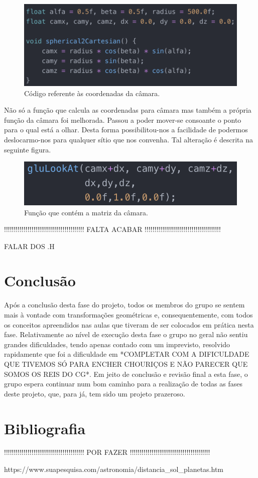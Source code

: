 \documentclass[a4paper]{article}
\begin{document}
\begin{figure}[H]
\centering
\includegraphics[scale=0.9]{camara.png}
\caption{Código referente às coordenadas da câmara.}
\label{img:camara}
\end{figure}

Não só a função que calcula as coordenadas para câmara mas também a própria função da câmara foi melhorada. Passou a poder mover-se consoante o ponto para o qual está a olhar. Desta forma possibilitou-nos a facilidade de podermos deslocarmo-nos para qualquer sítio que nos convenha. Tal alteração é descrita na seguinte figura.

\begin{figure}[H]
\centering
\includegraphics[scale=0.9]{mat_camara.png}
\caption{Função que contém a matriz da câmara.}
\label{img:mat_camara}
\end{figure}

!!!!!!!!!!!!!!!!!!!!!!!!!!!!!!!!!!!!!!!!! FALTA ACABAR !!!!!!!!!!!!!!!!!!!!!!!!!!!!!!!!!!!!!!!

FALAR DOS .H

\newpage

\section{Conclusão}
\label{sec:conclusao}

Após a conclusão desta fase do projeto, todos os membros do grupo se sentem mais à vontade com transformações geométricas e, consequentemente, com todos os conceitos apreendidos nas aulas que tiveram de ser colocados em prática nesta fase. Relativamente ao nível de execução desta fase o grupo no geral não sentiu grandes dificuldades, tendo apenas contado com um imprevisto, resolvido rapidamente que foi a dificuldade em *COMPLETAR COM A DIFICULDADE QUE TIVEMOS SÓ PARA ENCHER CHOURIÇOS E NÃO PARECER QUE SOMOS OS REIS DO CG*.
Em jeito de conclusão e revisão final a esta fase, o grupo espera continuar num bom caminho para a realização de todas as fases deste projeto, que, para já, tem sido um projeto prazeroso.

\section{Bibliografia}
\label{sec:bibliografia}

!!!!!!!!!!!!!!!!!!!!!!!!!!!!!!!!!!!!!!!!! POR FAZER !!!!!!!!!!!!!!!!!!!!!!!!!!!!!!!!!!!!!!!!!

https://www.suapesquisa.com/astronomia/distancia\_sol\_planetas.htm
\end{document}
